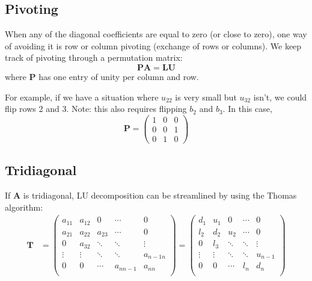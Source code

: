 \documentclass[12pt]{article}
\newcommand{\ve}[1]{\ensuremath{\mathbf{#1}}}
\begin{document}
\subsection*{Pivoting}
When any of the diagonal coefficients are equal to zero (or close to zero), one way of avoiding it is row or column pivoting (exchange of rows or columns). We keep track of pivoting through a permutation matrix:
\[\ve{P}\ve{A} = \ve{L}\ve{U}\]
where $\ve{P}$ has one entry of unity per column and row.

For example, if we have a situation where $u_{22}$ is very small but $u_{32}$ isn't, we could flip rows 2 and 3. Note: this also requires flipping $b_2$ and $b_3$. In this case, 
\[\ve{P} = \begin{pmatrix}
  1 & 0 & 0 \\
  0 & 0 & 1 \\
  0 & 1 & 0
\end{pmatrix} \]

\subsection*{Tridiagonal}
If $\ve{A}$ is tridiagonal, LU decomposition can be streamlined by using the Thomas algorithm:
%
\begin{align}
    \ve{T} &= \begin{pmatrix}
      a_{11} & a_{12} & 0      & \cdots    & 0 \\
      a_{21} & a_{22} & a_{23} & \cdots    & 0 \\
      0      & a_{32} & \ddots & \ddots    & \vdots \\     
      \vdots & \vdots & \ddots & \ddots    & a_{n-1 n}\\
      0      & 0      & \cdots & a_{n n-1} & a_{nn} \\
    \end{pmatrix} =
    \begin{pmatrix}
      d_{1}  & u_{1}  & 0      & \cdots & 0 \\
      l_{2}  & d_{2}  & u_{2}  & \cdots & 0 \\
      0      & l_{3}  & \ddots & \ddots & \vdots \\     
      \vdots & \vdots & \ddots & \ddots & u_{n-1}\\
      0      & 0      & \cdots & l_{n}  & d_{n} \\
    \end{pmatrix} \nonumber   
\end{align} 
\end{document}
